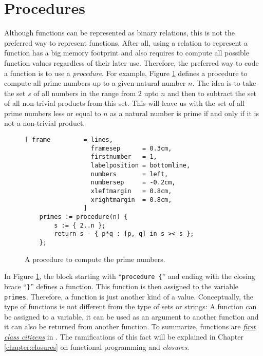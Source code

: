 \section{Procedures}
Although functions can be represented as binary relations, this is not the preferred way
to represent functions.  After all, using a relation to represent a function
has a big memory footprint and also requires to compute all possible function
values regardless of their later use.  Therefore, the preferred way to code a function is
to use a \emph{procedure}.  For example, Figure \ref{fig:primes.stlx} defines a procedure
to compute all 
prime numbers up to a given natural number $n$.  The idea is to take the set $s$ of all numbers in
the range from $2$ upto $n$ and then to subtract the set of all non-trivial
products from this set.  This will leave us with the set of all prime numbers less or
equal to $n$ as a natural number is prime if and only if it is not a non-trivial product.

\begin{figure}[!ht]
\centering
\begin{Verbatim}[ frame         = lines, 
                  framesep      = 0.3cm, 
                  firstnumber   = 1,
                  labelposition = bottomline,
                  numbers       = left,
                  numbersep     = -0.2cm,
                  xleftmargin   = 0.8cm,
                  xrightmargin  = 0.8cm,
                ]
    primes := procedure(n) { 
        s := { 2..n }; 
        return s - { p*q : [p, q] in s >< s }; 
    };
\end{Verbatim}
\vspace*{-0.3cm}
\caption{A procedure to compute the prime numbers.}
\label{fig:primes.stlx}
\end{figure}

In Figure \ref{fig:primes.stlx}, the block starting with ``\texttt{procedure \{}'' and
ending with the closing brace ``\texttt{\}}'' defines a function.  This function is then
assigned to the variable \texttt{primes}.  Therefore, a function is just another kind of a
value.  Conceptually, the type of functions is not different from the type of sets or
strings:  A function can be assigned to a variable, it can be used as an argument to
another function and it can also be returned from another function.  To summarize,
functions are \href{http://en.wikipedia.org/wiki/First-class_function}{\emph{first class citizens}} 
in \setlx.  The ramifications of
this fact will be explained in Chapter \ref{chapter:closures} on functional programming
and \emph{closures}.
\vspace*{0.2cm}

